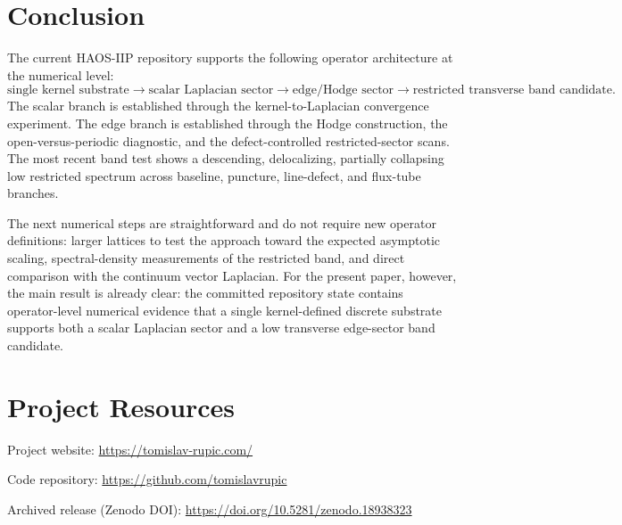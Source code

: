 \documentclass[11pt]{article}
\begin{document}
\section{Conclusion}
The current HAOS-IIP repository supports the following operator architecture at the numerical level:
\begin{equation}
\text{single kernel substrate}
\to
\text{scalar Laplacian sector}
\to
\text{edge/Hodge sector}
\to
\text{restricted transverse band candidate}.
\end{equation}
The scalar branch is established through the kernel-to-Laplacian convergence experiment. The edge branch is established through the Hodge construction, the open-versus-periodic diagnostic, and the defect-controlled restricted-sector scans. The most recent band test shows a descending, delocalizing, partially collapsing low restricted spectrum across baseline, puncture, line-defect, and flux-tube branches.

The next numerical steps are straightforward and do not require new operator definitions: larger lattices to test the approach toward the expected asymptotic scaling, spectral-density measurements of the restricted band, and direct comparison with the continuum vector Laplacian. For the present paper, however, the main result is already clear: the committed repository state contains operator-level numerical evidence that a single kernel-defined discrete substrate supports both a scalar Laplacian sector and a low transverse edge-sector band candidate.

\section*{Project Resources}
Project website: \url{https://tomislav-rupic.com/}

Code repository: \url{https://github.com/tomislavrupic}

Archived release (Zenodo DOI): \url{https://doi.org/10.5281/zenodo.18938323}
\end{document}
